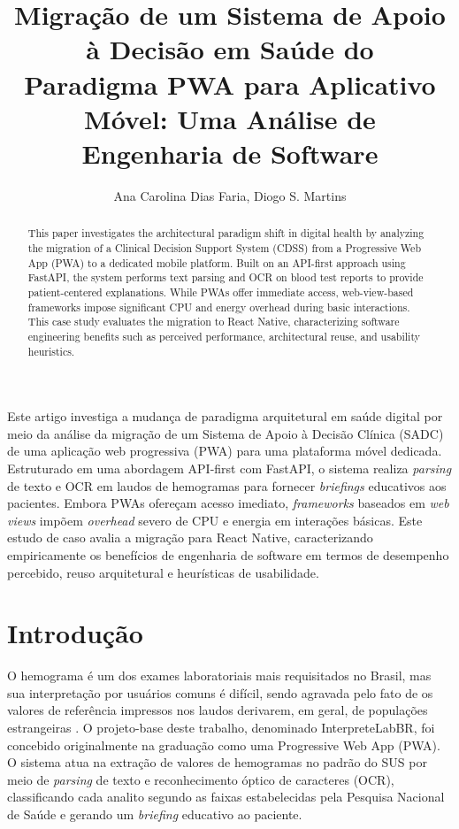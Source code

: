 \documentclass[12pt]{article}
\title{Migração de um Sistema de Apoio à Decisão em Saúde do\\
Paradigma PWA para Aplicativo Móvel: Uma Análise de\\
Engenharia de Software}
\author{Ana Carolina Dias Faria\inst{1}, Diogo S. Martins\inst{1}}
\begin{document}
\maketitle

\begin{abstract}
This paper investigates the architectural paradigm shift in digital health
by analyzing the migration of a Clinical Decision Support System (CDSS)
from a Progressive Web App (PWA) to a dedicated mobile platform.
Built on an API-first approach using FastAPI, the system performs text
parsing and OCR on blood test reports to provide patient-centered
explanations. While PWAs offer immediate access, web-view-based
frameworks impose significant CPU and energy overhead during basic
interactions. This case study evaluates the migration to React Native,
characterizing software engineering benefits such as perceived
performance, architectural reuse, and usability heuristics.
\end{abstract}

\begin{resumo}
Este artigo investiga a mudança de paradigma arquitetural em saúde
digital por meio da análise da migração de um Sistema de Apoio à
Decisão Clínica (SADC) de uma aplicação web progressiva (PWA) para
uma plataforma móvel dedicada. Estruturado em uma abordagem API-first
com FastAPI, o sistema realiza \textit{parsing} de texto e OCR em laudos
de hemogramas para fornecer \textit{briefings} educativos aos pacientes.
Embora PWAs ofereçam acesso imediato, \textit{frameworks} baseados em
\textit{web views} impõem \textit{overhead} severo de CPU e energia em
interações básicas. Este estudo de caso avalia a migração para React
Native, caracterizando empiricamente os benefícios de engenharia de
software em termos de desempenho percebido, reuso arquitetural e
heurísticas de usabilidade.
\end{resumo}

\section{Introdução}

O hemograma é um dos exames laboratoriais mais requisitados no Brasil,
mas sua interpretação por usuários comuns é difícil, sendo agravada pelo
fato de os valores de referência impressos nos laudos derivarem, em geral,
de populações estrangeiras \cite{rosenfeld2019}. O projeto-base deste
trabalho, denominado InterpreteLabBR, foi concebido originalmente na
graduação como uma Progressive Web App (PWA). O sistema atua na extração
de valores de hemogramas no padrão do SUS por meio de \textit{parsing} de
texto e reconhecimento óptico de caracteres (OCR), classificando cada
analito segundo as faixas estabelecidas pela Pesquisa Nacional de Saúde
\cite{rosenfeld2019} e gerando um \textit{briefing} educativo ao paciente.
\end{document}
